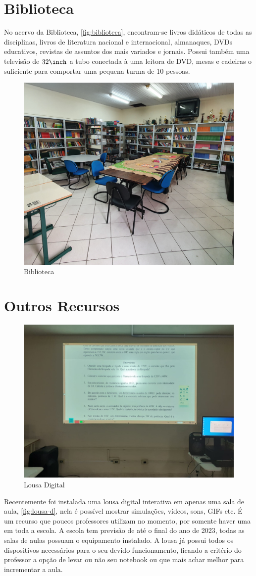 \section{Biblioteca}
No acervo da Biblioteca, \autoref{fig:biblioteca}, encontram-se livros didáticos de todas as disciplinas, livros de literatura nacional e internacional, almanaques, \acp{DVD} educativos, revistas de assuntos dos mais variados e jornais. Possui também uma televisão de $32\inch$ a tubo conectada à uma leitora de \ac{DVD}, mesas e cadeiras o suficiente para comportar uma pequena turma de 10 pessoas.
\vspace{8pt}

\begin{figure}[!ht]
    \begin{center}
        \includegraphics[width=.6\textwidth]{03-elementos/03.2_textual/03.2.1_fig/biblioteca01.jpg}
        \caption{Biblioteca}
        \label{fig:biblioteca} 
    \end{center}    
\end{figure}

\section{Outros Recursos}
\setlength\intextsep{0pt}
\begin{figure}
    \centering
    \includegraphics[width=.45\textwidth]{03-elementos/03.2_textual/03.2.1_fig/d-lousa.jpeg} 
    \caption{Lousa Digital}
    \label{fig:lousa-d}    
\end{figure}
Recentemente foi instalada uma lousa digital interativa em apenas uma sala de aula, \autoref{fig:lousa-d}, nela é possível mostrar simulações, vídeos, sons, GIFs etc. É um recurso que poucos professores utilizam no momento, por somente haver uma em toda a escola. A escola tem previsão de até o final do ano de 2023, todas as salas de aulas possuam o equipamento instalado. A lousa já possui todos os dispositivos necessários para o seu devido funcionamento, ficando a critério do professor a opção de levar ou não seu notebook ou que mais achar melhor para incrementar a aula.

